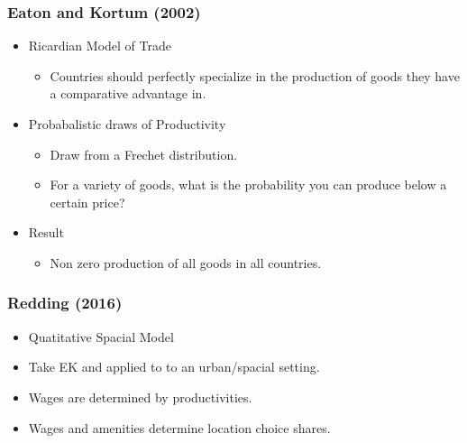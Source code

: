 \documentclass[serif, 9pt, aspectratio=32]{beamer}
\begin{document}
\begin{frame}
    \centering
    \frametitle{Eaton and Kortum (2002)}
    \begin{itemize}
        \setlength{\itemsep}{3em}
        \item Ricardian Model of Trade
              \begin{itemize}
                  \item Countries should perfectly specialize in the production of goods they have a comparative advantage in.
              \end{itemize}
        \item Probabalistic draws of Productivity
              \begin{itemize}
                  \item Draw from a Frechet distribution.
                  \item For a variety of goods, what is the probability you can produce below a certain price?
              \end{itemize}
        \item Result
              \begin{itemize}
                  \item Non zero production of all goods in all countries.
              \end{itemize}
    \end{itemize}
\end{frame}

\begin{frame}
    \centering
    \frametitle{Redding (2016)}
    \begin{itemize}
        \setlength{\itemsep}{3em}
        \item Quatitative Spacial Model
        \item Take EK and applied to to an urban/spacial setting.
        \item Wages are determined by productivities.
        \item Wages and amenities determine location choice shares.
    \end{itemize}
\end{frame}
\end{document}
